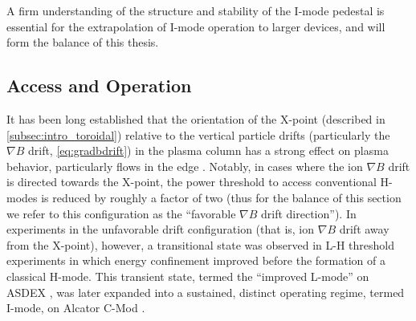 \noindent A firm understanding of the structure and stability of the I-mode pedestal is essential for the extrapolation of I-mode operation to larger devices, and will form the balance of this thesis.

\subsection{Access and Operation}\label{subsec:hcr_imode_access}

It has been long established that the orientation of the X-point (described in \cref{subsec:intro_toroidal}) relative to the vertical particle drifts (particularly the $\nabla B$ drift, \cref{eq:gradbdrift}) in the plasma column has a strong effect on plasma behavior, particularly flows in the edge \cite{LaBombard2004,Fenzi2005,Hubbard2007,LaBombard2008}.  Notably, in cases where the ion $\nabla B$ drift is directed towards the X-point, the power threshold to access conventional H-modes is reduced by roughly a factor of two \cite{Carlstrom1998,Groebner1998,Suttrop2003} (thus for the balance of this section we refer to this configuration as the ``favorable $\nabla B$ drift direction'').  In experiments in the unfavorable drift configuration (that is, ion $\nabla B$ drift away from the X-point), however, a transitional state was observed in L-H threshold experiments in which energy confinement improved before the formation of a classical H-mode.  This transient state, termed the ``improved L-mode'' on ASDEX \cite{Ryter1998}, was later expanded into a sustained, distinct operating regime, termed I-mode, on Alcator C-Mod \cite{Whyte2010,McDermott2009a,Hubbard2011}.

\begin{figure}[t]
 \pushtooutside
\end{figure}

